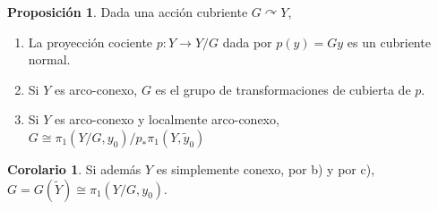 \documentclass[spanish]{book}
\theoremstyle{definition}
\newtheorem*{prop}{Proposición}
\newtheorem*{coro}{Corolario}
\begin{document}
\begin{prop}
	Dada una acción cubriente $G\curvearrowright Y$,
	\begin{enumerate}[label=\alph*)]
		\item La proyección cociente $p:Y\to Y/G$ dada por $p(y)=Gy$ es un cubriente normal.
		\item Si $Y$ es arco-conexo, $G$ es el grupo de transformaciones de cubierta de $p$.
		\item Si $Y$ es arco-conexo y localmente arco-conexo, $G\cong\pi_1(Y/G,y_0)/p_*\pi_1(Y,\tilde{y}_0)$
	\end{enumerate}
\end{prop}
\begin{coro}
	Si además $Y$ es simplemente conexo, por b) y por c), $G=G(\tilde{Y})\cong\pi_1(Y/G,y_0)$.
\end{coro}
\end{document}
